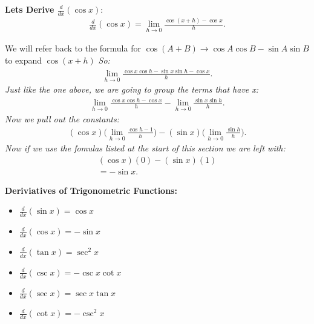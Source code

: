 \documentclass{report}
\begin{document}
  \bigbreak \noindent 
   \begin{mdframed}
     \textbf{Lets Derive $ \frac{d}{dx}(\cos{x})$}:
     \begin{align*}
       \frac{d}{dx}(\cos{x}) = \lim_{h \to 0}{ \frac{\cos(x+h) - \cos{x}}{h}}
     .\end{align*}
   \end{mdframed} 
   \bigbreak \noindent  
 We will refer back to the formula for $\cos{(A+B)} \rightarrow \cos{A} \cos{B} - \sin{A} \sin{B}$ to expand $ \cos{(x+h)}$
 \bigbreak \noindent 
 \textit{So:} 
 \begin{align*}
   \lim_{h \to 0}{ \frac{ \cos{x} \cos{h} - \sin{x} \sin{h} - \cos{x}}{h}}
 .\end{align*}
 \bigbreak \noindent 
  \textit{Just like the one above, we are going to group the terms that have x:}
  \begin{align*}
    \lim_{h \to 0}{ \frac{ \cos{x} \cos{h} - \cos{x}}{h}} - \lim_{h \to 0}{ \frac{ \sin{x} \sin{h}}{h}}
  .\end{align*}
  \bigbreak \noindent 
  \textit{Now we pull out the constants:}
  \begin{align*}
    ( \cos{x}) \bigg( \lim_{h \to 0}{ \frac{ \cos{h} - 1}{h}}\bigg) - ( \sin{x}) \bigg( \lim_{h \to 0}{ \frac{ \sin{h}}{h}}\bigg)
  .\end{align*}
  \bigbreak \noindent 
  \textit{Now if we use the fomulas listed at the start of this section we are left with:}
  \begin{align*}
    ( \cos{x})(0) - ( \sin{x})(1) \\ 
    = - \sin{x}
  .\end{align*}

  \bigbreak \noindent \bigbreak \noindent 
  \begin{mdframed}
  \begin{large}
    \textbf{Deriviatives of Trigonometric Functions:}
  \end{large}
  \bigbreak \noindent 
  \begin{itemize}
    \item $ \frac{d}{dx}( \sin{x}) = \cos{x}$
    \item $ \frac{d}{dx}( \cos{x}) = - \sin{x}$
    \item $ \frac{d}{dx}( \tan{x}) = \sec^2{x}$
    \item $ \frac{d}{dx}( \csc{x}) =-\csc{x}\cot{x}$
    \item $ \frac{d}{dx}( \sec{x}) =\sec{x}\tan{x}$
    \item $ \frac{d}{dx}( \cot{x}) =-\csc^2{x}$
  \end{itemize}
  \end{mdframed}
\end{document}
